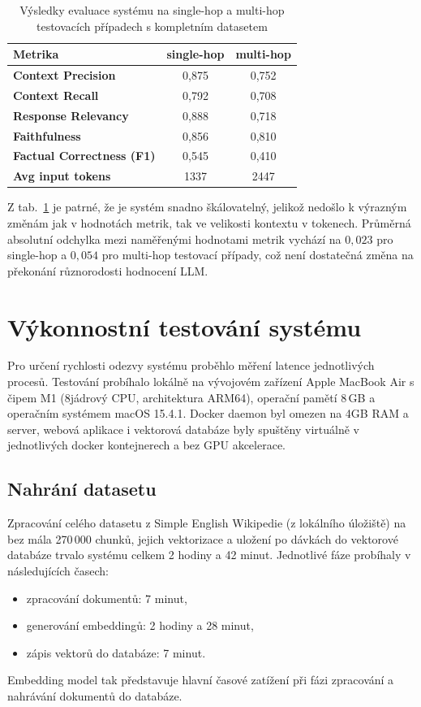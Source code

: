 \begin{table}[H]
    \centering
    \renewcommand{\arraystretch}{1.2}
    \begin{tabular}{|l|c|c|}
        \hline
        \textbf{Metrika} & \textbf{single-hop} & \textbf{multi-hop} \\
        \hline
        \textbf{Context Precision}         & 0{,}875 & 0{,}752 \\
        \textbf{Context Recall}            & 0{,}792 & 0{,}708 \\
        \textbf{Response Relevancy}        & 0{,}888 & 0{,}718 \\
        \textbf{Faithfulness}              & 0{,}856 & 0{,}810 \\
        \textbf{Factual Correctness (F1)}  & 0{,}545 & 0{,}410 \\
        \textbf{Avg input tokens}          & 1337 & 2447 \\
        \hline
    \end{tabular}
    \caption{Výsledky evaluace systému na single-hop a multi-hop testovacích případech s kompletním datasetem}
    \label{tab:finalbigeval}
\end{table}

Z tab.~\ref{tab:finalbigeval} je patrné, že je systém snadno škálovatelný, jelikož nedošlo k výrazným změnám jak v hodnotách metrik, tak ve velikosti kontextu v tokenech. Průměrná absolutní odchylka mezi naměřenými hodnotami metrik vychází na $0{,}023$ pro single-hop a $0{,}054$ pro multi-hop testovací případy, což není dostatečná změna na překonání různorodosti hodnocení LLM.

\section{Výkonnostní testování systému}
Pro určení rychlosti odezvy systému proběhlo měření latence jednotlivých procesů. Testování probíhalo lokálně na vývojovém zařízení Apple MacBook Air s čipem M1 (8jádrový CPU, architektura ARM64), operační pamětí 8\,GB a operačním systémem macOS 15.4.1. Docker daemon byl omezen na 4GB RAM a server, webová aplikace i vektorová databáze byly spuštěny virtuálně v jednotlivých docker kontejnerech a bez GPU akcelerace.

\subsection{Nahrání datasetu}
Zpracování celého datasetu z Simple English Wikipedie (z lokálního úložiště) na bez mála 270\,000 chunků, jejich vektorizace a uložení po dávkách do vektorové databáze trvalo systému celkem 2 hodiny a 42 minut. Jednotlivé fáze probíhaly v následujících časech:
\begin{itemize}
    \item zpracování dokumentů: 7 minut,
    \item generování embeddingů: 2 hodiny a 28 minut,
    \item zápis vektorů do databáze: 7 minut.
\end{itemize}
Embedding model tak představuje hlavní časové zatížení při fázi zpracování a nahrávání dokumentů do databáze.

